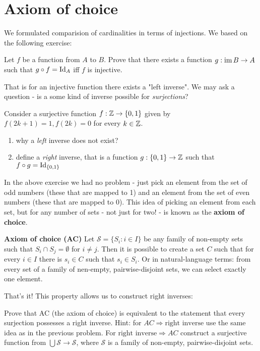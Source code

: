 
\section{Axiom of choice}
We formulated comparision of cardinalities in terms of injections. We based on the following exercise:

\begin{exercise}
  Let $f$ be a function from $A$ to $B$. Prove that there exists a function $g: \text{im\,} B\to A$ such that $g\circ f=\text{Id}_A$ iff $f$ is injective.
\end{exercise}

That is for an injective function there exists a "left inverse". We may ask a question - is a some kind of inverse possible for \emph{surjections}?

\begin{exercise}
  Consider a surjective function $f: \mathbb Z \to \{0,1\}$ given by $f(2k+1) = 1, f(2k)=0$ for every $k\in \mathbb Z$.
  \begin{enumerate}
    \item why a \emph{left} inverse does not exist?
    \item define a \emph{right} inverse, that is a function $g:\{0,1\}\to \mathbb Z$ such that $f\circ g=\text{Id}_{\{0,1\}}$
  \end{enumerate}
\end{exercise}

In the above exercise we had no problem - just pick an element from the set of odd numbers (these that are mapped to 1) and an element from the set of even numbers (these that are mapped to 0). This idea
of picking an element from each set, but for any number of sets - not just for two! - is known as the \textbf{axiom of choice}.

\begin{definition}
  \textbf{Axiom of choice (AC)} Let $\mathcal S=\{S_i: i\in I\}$ be any family of non-empty sets such that $S_i\cap S_j=\emptyset$ for $i\neq j$. Then it is possible to create a set $C$ such that for every $i\in I$ there is $s_i\in C$ such that $s_i\in S_i$. Or in natural-language terms: from every set of a family of nen-empty, pairwise-disjoint sets, we can select exactly one element.
\end{definition}

That's it! This property allows us to construct right inverses:

\begin{exercise}
  Prove that AC (the axiom of choice) is equivalent to the statement that every surjection possesses a right inverse. Hint: for $AC\Rightarrow \text{right inverse}$ use the same idea as in the previous problem. For
  $\text{right inverse}\Rightarrow AC$ construct a surjective function from $\bigcup \mathcal S\to \mathcal S$, where $\mathcal S$ is a family of non-empty, pairwise-disjoint sets.
\end{exercise}

